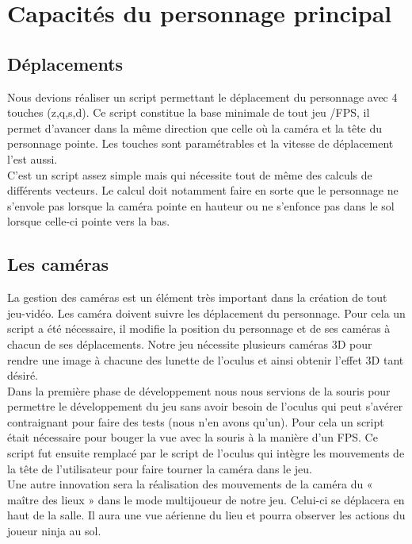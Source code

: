 \documentclass[12pt]{article}
\begin{document}
\newpage

\section{Capacités du personnage principal}

\subsection{Déplacements}

Nous devions réaliser un script permettant le déplacement du personnage avec 4 touches (z,q,s,d). Ce script constitue la base minimale de tout jeu /\gls{FPS}, il permet d’avancer dans la même direction que celle où la caméra et la tête du personnage pointe. Les touches sont paramétrables et la vitesse de déplacement l’est aussi.\\
C’est un script assez simple mais qui nécessite tout de même des calculs de différents vecteurs. Le calcul doit notamment faire en sorte que le personnage ne s’envole pas lorsque la caméra pointe en hauteur ou ne s’enfonce pas dans le sol lorsque celle-ci pointe vers la bas.

\subsection{Les caméras}

La gestion des caméras est un élément très important dans la création de tout jeu-vidéo. Les caméra doivent suivre les déplacement du personnage. Pour cela un script a été nécessaire, il modifie la position du personnage et de ses caméras à chacun de ses déplacements. Notre jeu nécessite plusieurs caméras 3D pour rendre une image à chacune des lunette de l’oculus et ainsi obtenir l’effet 3D tant désiré.\\
Dans la première phase de développement nous nous servions de la souris pour permettre le développement du jeu sans avoir besoin de l’oculus qui peut s’avérer contraignant pour faire des tests (nous n’en avons qu’un). Pour cela un script était nécessaire pour bouger la vue avec la souris à la manière d’un FPS. Ce script fut ensuite remplacé par le script de l’oculus qui intègre les mouvements de la tête de l’utilisateur pour faire tourner la caméra dans le jeu.\\
Une autre innovation sera la réalisation des mouvements de la caméra du « maître des lieux » dans le mode multijoueur de notre jeu. Celui-ci se déplacera en haut de la salle. Il aura une vue aérienne du lieu et pourra observer les actions du joueur ninja au sol.
\end{document}
